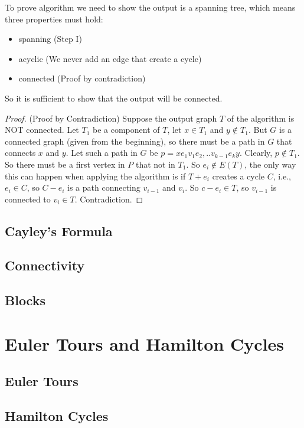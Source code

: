 			To prove algorithm we need to show the output is a spanning tree, which means three properties must hold:
			\begin{itemize}
				\item spanning (Step I)
				\item acyclic (We never add an edge that create a cycle)
				\item connected (Proof by contradiction)
			\end{itemize}
			So it is sufficient to show that the output will be connected.
			\begin{proof}
				(Proof by Contradiction) Suppose the output graph $T$ of the algorithm is NOT connected. Let $T_1$ be a component of $T$, let $x\in T_1$ and $y \notin T_1$. But $G$ is a connected graph (given from the beginning), so there must be a path in $G$ that connects $x$ and $y$. Let such a path in $G$ be $p=xe_1v_1e_2,..v_{k-1}e_ky$. Clearly, $p\notin T_1$. So there must be a first vertex in $P$ that not in $T_1$. So $e_i \notin E(T)$, the only way this can happen when applying the algorithm is if $T + e_i$ creates a cycle $C$, i.e., $e_i \in C$, so $C - e_i$ is a path connecting $v_{i-1}$ and $v_i$. So $c - e_i \in T$, so $v_{i-1}$ is connected to $v_i \in T$. Contradiction. 
			\end{proof}

		\section{Cayley's Formula}

		\section{Connectivity}

		\section{Blocks}

	\chapter{Euler Tours and Hamilton Cycles}
		\section{Euler Tours}

		\section{Hamilton Cycles}

